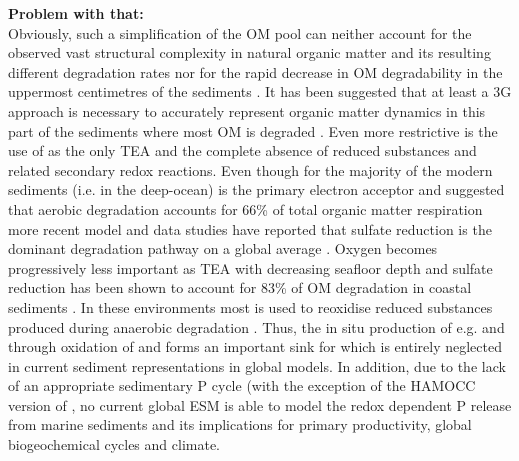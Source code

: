 \documentclass[gmd, manuscript]{copernicus}
\begin{document}
\textbf{Problem with that:} \\
Obviously, such a simplification of the OM pool can neither account for the observed vast structural complexity in natural organic matter and its resulting different degradation 
rates nor for the rapid decrease in OM degradability in the uppermost centimetres of the sediments \citep{arndt_quantifying_2013}. It has been suggested that at least a 3G approach 
is necessary to accurately represent organic matter dynamics in this part of the sediments where most OM is degraded \citep[e.g.][]{soetaert_model_1996}. 
Even more restrictive is the use of  as the only TEA and the complete absence of reduced substances and related secondary redox reactions. 
Even though for the majority of the modern sediments (i.e. in the deep-ocean)  is the primary electron acceptor and 
\citet{archer_model_2002} suggested that aerobic degradation accounts for 66\% of total organic matter respiration 
more recent model and data studies have reported that sulfate reduction is the dominant degradation pathway on a global average 
\citep[with contributions of 55-76\%][]{canfield_aquatic_2005, jorgensen_sulfur_2006, thullner_global_scale_2009}. 
Oxygen becomes progressively less important as TEA with decreasing seafloor depth and sulfate reduction has been shown to account for 83\% of OM degradation in 
coastal sediments \citep{krumins_dissolved_2013}. 
In these environments most  is used to reoxidise reduced substances produced during anaerobic degradation \citep{canfield_aquatic_2005, thullner_global_scale_2009}. 
Thus, the in situ production of e.g.  and  through oxidation of  and  forms an important sink for  which is entirely neglected in 
current sediment representations in global models. In addition, due to the lack of an appropriate sedimentary P cycle (with the exception of the HAMOCC version of \citet{palastanga_long_term_2011}, no current global ESM is able to model 
the redox dependent P release from marine sediments and its implications for primary productivity, global biogeochemical cycles and climate. 

\end{document}
